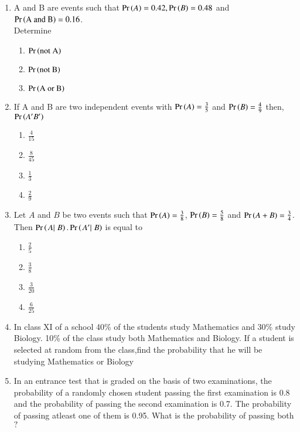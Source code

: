 \begin{enumerate}[label=\thesection.\arabic*,ref=\thesection.\theenumi]
\solution

	\item A and B are events such that $\Pr\left(A\right)=0.42, \Pr\left(B\right)=0.48$ and $\Pr\left(\text{A and B}\right)=0.16$. \\
Determine 
\begin{enumerate}
\item $\Pr\left(\text{not A}\right)$ 
\item $\Pr\left(\text{not B}\right)$  
\item $\Pr\left(\text{A or B}\right)$ 
\end{enumerate}
\solution

\item If A and B are two independent events with $\Pr\left(A\right)=\frac{3}{5}$ and $\Pr\left(B\right)=\frac{4}{9}$ then, $\Pr\left(A^\prime B^\prime\right)$
\begin{enumerate}
\item $\frac{4}{15}$ 
\item $\frac{8}{45}$
\item $\frac{1}{3}$
\item $\frac{2}{9}$
\end{enumerate}
		\solution
		 
\item Let $A$ and $B$ be two  events such that $\Pr\left(A\right) = \frac{3}{8}$, $\Pr\left(B\right) = \frac{5}{8}$ and $\Pr\left(A+B\right) = \frac{3}{4}$. Then $\Pr\left(\left.{A}|\right.{B}\right).\Pr\left(\left.{A^\prime} |\right.{B}\right)$ is equal to
\begin{enumerate}[label=(\alph*)]
\item $\frac{2}{5}$
\vspace{3pt}
\item $\frac{3}{8}$
\vspace{3pt}
\item $\frac{3}{20}$
\vspace{3pt}
\item $\frac{6}{25}$
\end{enumerate}

\item  In class XI of a school 40\% of the students study Mathematics and 30\% study Biology. 10\% of the class study both Mathematics and Biology. If a student is selected at random from the class,find the probability that he will be studying Mathematics or Biology
	\\
	\solution

\item In an entrance test that is graded on the basis of two examinations, the probability of a randomly chosen student passing the first examination is 0.8 and the probability of passing the second examination is 0.7. The probability of passing atleast one of them is 0.95. What is the probability of passing both$?$

\end{enumerate}
